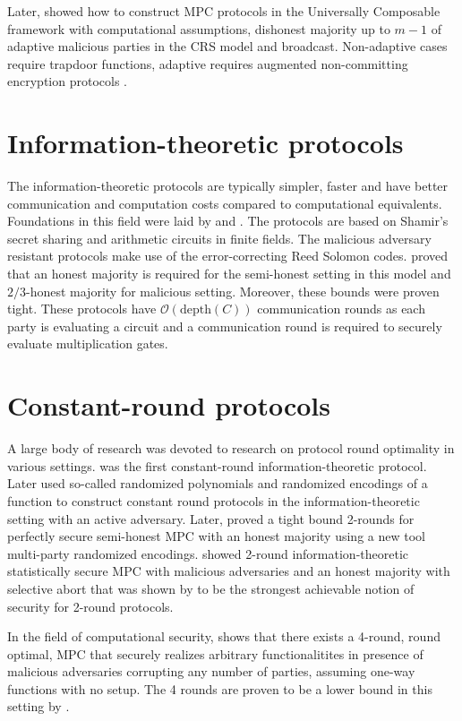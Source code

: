 \documentclass[
  digital, %
  twoside, %
  table,   %
  lof,     %
  lot,     %
]{fithesis3}
\newcommand{\bigO}[0]{\mathcal{O}}
\theoremstyle{definition}
\theoremstyle{remark}
\begin{document}
Later, \cite{CLOS02} showed how to construct MPC protocols in the Universally Composable framework with computational assumptions, dishonest majority up to $m-1$ of adaptive malicious parties in the CRS model and broadcast. 
Non-adaptive cases require trapdoor functions, adaptive requires augmented non-committing encryption protocols \cite{CFGN96}.

\section{Information-theoretic protocols}\label{sec:soa:infproto}%
The information-theoretic protocols are typically simpler, faster and have better communication and computation costs compared to computational equivalents. Foundations in this field were laid by \cite{BGW88} and \cite{CCD88}. The protocols are based on Shamir's secret sharing and arithmetic circuits in finite fields. The malicious adversary resistant protocols make use of the error-correcting Reed Solomon codes. \cite{BGW88} proved that an honest majority is required for the semi-honest setting in this model and $2/3$-honest majority for malicious setting. Moreover, these bounds were proven tight. These protocols have $\bigO(\text{depth}(C))$ communication rounds as each party is evaluating a circuit and a communication round is required to securely evaluate multiplication gates.

\section{Constant-round protocols}\label{sec:soa:const_rounds}%
A large body of research was devoted to research on protocol round optimality in various settings. \cite{BB89} was the first constant-round information-theoretic protocol. Later \cite{IK00, IK02} used so-called randomized polynomials and randomized encodings \cite{AIK04} of a function to construct constant round protocols in the information-theoretic setting with an active adversary. Later, \cite{ABT18} proved a tight bound 2-rounds for perfectly secure semi-honest MPC with an honest majority using a new tool multi-party randomized encodings. \cite{cryptoeprint:2018:1078} showed 2-round information-theoretic statistically secure MPC with malicious adversaries and an honest majority with selective abort that was shown by \cite{GIKR04} to be the strongest achievable notion of security for 2-round protocols.

In the field of computational security, \cite{cryptoeprint:2017:1056} shows that there exists a 4-round, round optimal, MPC that securely realizes arbitrary functionalitites in presence of malicious adversaries corrupting any number of parties, assuming one-way functions with no setup. The 4 rounds are proven to be a lower bound in this setting by \cite{cryptoeprint:2016:252}.
\end{document}
